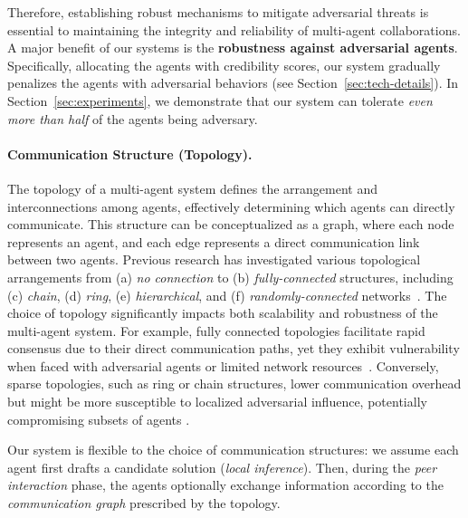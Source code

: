 Therefore, establishing robust mechanisms to mitigate adversarial threats is essential to maintaining the integrity and reliability of multi-agent collaborations.
A major benefit of our systems is the {\bf robustness against adversarial agents}.
Specifically, allocating the agents with credibility scores, our system gradually penalizes the agents with adversarial behaviors (see Section~\ref{sec:tech-details}).
In Section~\ref{sec:experiments}, we demonstrate that our system can tolerate {\em even more than half} of the agents being adversary.


\paragraph{Communication Structure (Topology).}
The topology of a multi-agent system defines the arrangement and interconnections among agents, effectively determining which agents can directly communicate. This structure can be conceptualized as a graph, where each node represents an agent, and each edge represents a direct communication link between two agents. 
Previous research has investigated various topological arrangements from (a) {\em no connection} to (b) {\em fully-connected} structures, including (c) {\em chain}, (d) {\em ring}, (e) {\em hierarchical}, and (f) {\em randomly-connected} networks~\cite{MoA, resilience, MA-LLM-topo, DyLAN}. 
The choice of topology significantly impacts both scalability and robustness of the multi-agent system. For example, fully connected topologies facilitate rapid consensus due to their direct communication paths, yet they exhibit vulnerability when faced with adversarial agents or limited network resources~\cite{multiagent-debate-attack}. Conversely, sparse topologies, such as ring or chain structures, lower communication overhead but might be more susceptible to localized adversarial influence, potentially compromising subsets of agents \cite{multi-agent-sys}. 

Our system is flexible to the choice of communication structures:
we assume each agent first drafts a candidate solution (\emph{local inference}). Then, during the 
{\em peer interaction} phase, the agents optionally exchange information according to the \emph{communication graph} prescribed by the topology.




